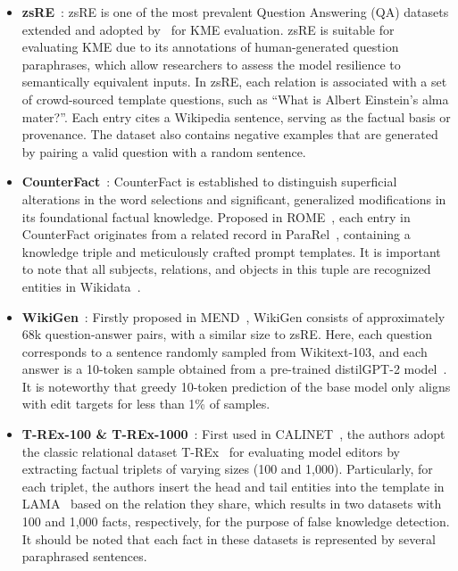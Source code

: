 \documentclass[acmsmall, screen]{acmart}
\begin{document}
\begin{itemize}[leftmargin=0.35cm]

\item \textbf{zsRE}~\cite{levy2017zero}: zsRE is one of the most prevalent Question Answering (QA) datasets extended and adopted by~\cite{cao2021editing,mitchell2022fast} for KME evaluation. zsRE is suitable for evaluating KME due to its annotations of human-generated question paraphrases, which allow researchers to assess the model resilience to semantically equivalent inputs. In zsRE, each relation is associated with a set of crowd-sourced template questions, such as ``What is Albert Einstein’s alma mater?''. Each entry cites a Wikipedia sentence, serving as the factual basis or provenance. The dataset also contains negative examples that are generated by pairing a valid question with a random sentence.
\item \textbf{CounterFact}~\cite{meng2022locating}: CounterFact is established to distinguish superficial alterations in the word selections and significant, generalized modifications in its foundational factual knowledge. Proposed in ROME~\cite{meng2022locating}, each entry in CounterFact originates from a related record in ParaRel~\cite{elazar2021measuring}, containing a knowledge triple and meticulously crafted prompt templates. It is important to note that all subjects, relations, and objects in this tuple are recognized entities in Wikidata~\cite{vrandevcic2014wikidata}.


\item \textbf{WikiGen}~\cite{mitchell2022fast}: Firstly proposed in MEND~\cite{mitchell2022fast}, WikiGen consists of approximately 68k question-answer pairs, with a similar size to zsRE. Here, each question corresponds to a sentence randomly sampled from Wikitext-103, and each answer is a 10-token sample obtained from a pre-trained distilGPT-2 model~\cite{ma2021ditilgpt2}. It is noteworthy that greedy 10-token prediction of the base model only aligns with edit targets for less than 1\% of samples.

\item \textbf{T-REx-100 \& T-REx-1000}~\cite{elsahar2018t}: First used in CALINET~\cite{CALINET}, the authors adopt the classic relational dataset T-REx~\cite{elsahar2018t} for evaluating model editors by extracting factual triplets of varying sizes (100 and 1,000). Particularly, for each triplet, the authors insert the head and tail entities into the template in LAMA~\cite{petroni2019language} based on the relation they share, which results in two datasets with 100 and 1,000 facts, respectively, for the purpose of false knowledge detection. It should be noted that each fact in these datasets is represented by several paraphrased sentences.



\end{itemize}
\end{document}
